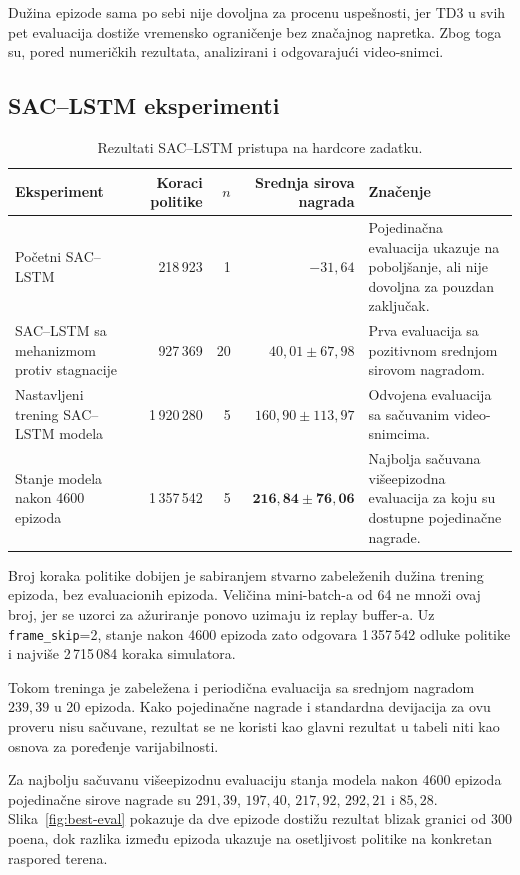 \documentclass[11pt,a4paper]{article}
\begin{document}
Dužina epizode sama po sebi nije dovoljna za procenu uspešnosti, jer TD3
u svih pet evaluacija dostiže vremensko ograničenje bez značajnog
napretka. Zbog toga su, pored numeričkih rezultata, analizirani i
odgovarajući video-snimci.

\subsection{SAC--LSTM eksperimenti}

\begin{table}[H]
\centering
\caption{Rezultati SAC--LSTM pristupa na hardcore zadatku.}
\label{tab:sac-lstm}
\begin{tabularx}{\textwidth}{YrrrY}
\toprule
Eksperiment & Koraci politike & \(n\) & Srednja sirova nagrada & Značenje \\
\midrule
Početni SAC--LSTM & 218\,923 & 1 & \(-31,64\) &
Pojedinačna evaluacija ukazuje na poboljšanje, ali nije dovoljna za
pouzdan zaključak. \\
SAC--LSTM sa mehanizmom protiv stagnacije & 927\,369 & 20 &
\(40,01\pm67,98\) &
Prva evaluacija sa pozitivnom srednjom sirovom nagradom. \\
Nastavljeni trening SAC--LSTM modela & 1\,920\,280 & 5 &
\(160,90\pm113,97\) &
Odvojena evaluacija sa sačuvanim video-snimcima. \\
Stanje modela nakon 4600 epizoda & 1\,357\,542 & 5 &
\(\mathbf{216,84\pm76,06}\) &
Najbolja sačuvana višeepizodna evaluacija za koju su dostupne
pojedinačne nagrade. \\
\bottomrule
\end{tabularx}
\end{table}

Broj koraka politike dobijen je sabiranjem stvarno zabeleženih dužina
trening epizoda, bez evaluacionih epizoda. Veličina mini-batch-a od 64 ne
množi ovaj broj, jer se uzorci za ažuriranje ponovo uzimaju iz replay
buffer-a. Uz \texttt{frame\_skip}=2, stanje nakon 4600 epizoda zato
odgovara 1\,357\,542 odluke politike i najviše 2\,715\,084 koraka simulatora.

Tokom treninga je zabeležena i periodična evaluacija sa srednjom nagradom
\(239,39\) u 20 epizoda. Kako pojedinačne nagrade i standardna devijacija
za ovu proveru nisu sačuvane, rezultat se ne koristi kao glavni rezultat
u tabeli niti kao osnova za poređenje varijabilnosti.

Za najbolju sačuvanu višeepizodnu evaluaciju stanja modela nakon 4600 epizoda
pojedinačne sirove nagrade su \(291,39\), \(197,40\), \(217,92\),
\(292,21\) i \(85,28\). Slika~\ref{fig:best-eval} pokazuje da dve epizode dostižu rezultat
blizak granici od 300 poena, dok razlika između epizoda ukazuje na
osetljivost politike na konkretan raspored terena.
\end{document}
